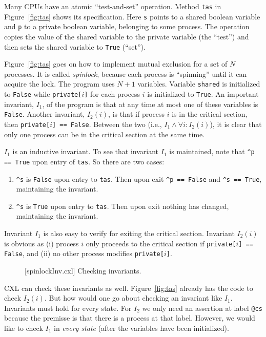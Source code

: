 \documentclass{report}
\newenvironment{code}{
\tcolorbox
}{
\endtcolorbox
}
\begin{document}
Many CPUs have an atomic ``test-and-set'' operation.
Method \texttt{tas} in Figure~\ref{fig:tas} shows its specification.
Here \texttt{s} points to a shared boolean variable and \texttt{p}
to a private boolean variable, belonging to some process.
The operation copies the value of the shared variable to the
private variable (the ``test'')
and then sets the shared variable to \texttt{True} (``set'').

Figure~\ref{fig:tas} goes on how to implement mutual exclusion for
a set of $N$ processes.
It is called \emph{spinlock}, because each process is ``spinning'' until
it can acquire the lock.
The program uses $N+1$ variables.
Variable \texttt{shared} is initialized to \texttt{False} while
\texttt{private[$i$]} for each process $i$ is initialized to \texttt{True}.
An important invariant, $I_1$, of the program is that at any time at most
one of these variables is \texttt{False}.
Another invariant, $I_2(i)$, is that if process $i$ is in the critical section,
then \texttt{private[$i$] == False}.
Between the two (i.e., $I_1 \land \forall i: I_2(i)$),
it is clear that only one process can be in the
critical section at the same time.

$I_1$ is an inductive invariant.
To see that invariant $I_1$ is maintained, note that
\texttt{\^{}p == True} upon entry of \texttt{tas}.
So there are two cases:
\begin{enumerate}
\item \texttt{\^{}s} is \texttt{False} upon entry to \texttt{tas}.
Then upon exit \texttt{\^{}p == False} and \texttt{\^{}s == True}, maintaining
the invariant.
\item \texttt{\^{}s} is \texttt{True} upon entry to \texttt{tas}.
Then upon exit nothing has changed, maintaining the invariant.
\end{enumerate}
Invariant $I_1$ is also easy to verify for exiting the critical section.
Invariant $I_2(i)$ is obvious as (i) process $i$ only proceeds to the critical
section if \texttt{private[$i$] == False}, and (ii) no other process modifies
\texttt{private[$i$]}.

\begin{figure}
\begin{code}
\end{code}
\caption{[spinlockInv.cxl] Checking invariants.}
\label{fig:tasinv}
\end{figure}

CXL can check these invariants as well.  Figure~\ref{fig:tas} already
has the code to check $I_2(i)$.  But how would one go about checking an
invariant like $I_1$.  Invariants must hold for every state.
For $I_2$ we only need an assertion at label \texttt{@cs} because the
premisse is that there is a process at that label.  However, we would
like to check $I_1$ in \emph{every state} (after the variables have
been initialized).
\end{document}
